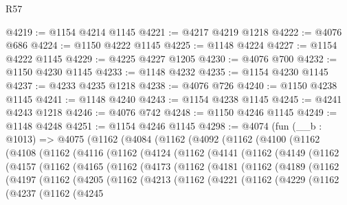 \begin{lexlean}{R57}
\begin{coremodule}
@4219 := @1154 @4214 @1145
@4221 := @4217 @4219 @1218
@4222 := @4076 @686
@4224 := @1150 @4222 @1145
@4225 := @1148 @4224
@4227 := @1154 @4222 @1145
@4229 := @4225 @4227 @1205
@4230 := @4076 @700
@4232 := @1150 @4230 @1145
@4233 := @1148 @4232
@4235 := @1154 @4230 @1145
@4237 := @4233 @4235 @1218
@4238 := @4076 @726
@4240 := @1150 @4238 @1145
@4241 := @1148 @4240
@4243 := @1154 @4238 @1145
@4245 := @4241 @4243 @1218
@4246 := @4076 @742
@4248 := @1150 @4246 @1145
@4249 := @1148 @4248
@4251 := @1154 @4246 @1145
@4298 := @4074
    (fun (__b : @1013) =>
    @4075
      (@1162
        (@4084
          (@1162
            (@4092
              (@1162
                (@4100
                  (@1162
                    (@4108
                      (@1162
                        (@4116
                          (@1162
                            (@4124
                              (@1162
                                (@4141
                                  (@1162
                                    (@4149
                                      (@1162
                                        (@4157
                                          (@1162
                                            (@4165
                                              (@1162
                                                (@4173
                                                  (@1162
                                                    (@4181
                                                      (@1162
                                                        (@4189
                                                          (@1162
                                                            (@4197
                                                              (@1162
                                                                (@4205
                                                                  (@1162
                                                                    (@4213
                                                                      (@1162
                                                                        (@4221
                                                                          (@1162
                                                                            (@4229
                                                                              (@1162
                                                                                (@4237
                                                                                  (@1162
                                                                                    (@4245

\end{coremodule}
\end{lexlean}
